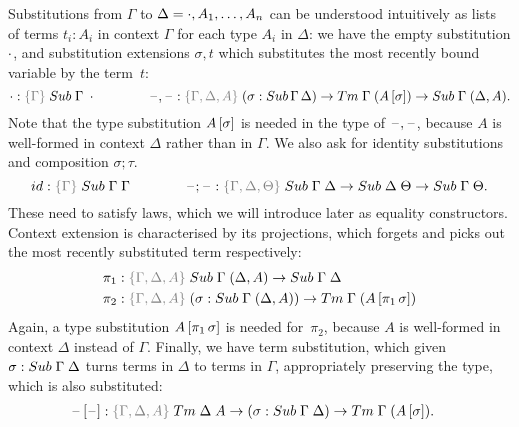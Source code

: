 \documentclass[a4paper,UKenglish,numberwithinsect,cleveref,thm-restate]{lipics-v2021}
\begin{document}
Substitutions from $\Gamma$ to $\Delta = \cdot, A_1, \ldots, A_n$ can be understood intuitively as lists of terms $t_i : A_i$ in context $\Gamma$ for each type $A_i$ in $\Delta$: we have the empty substitution $\cdot$, and substitution extensions $\sigma, t$ which substitutes the most recently bound variable by the term~$t$:
\[
  \emptysub : \implicit{\Gamma}\;\Sub\;\Gamma\;\emptyctx
  \qquad\qquad
  \blank,\blank : \implicit{\Gamma, \Delta, A}\; (\sigma : \Sub\,\Gamma\,\Delta) \to \Tm\;\Gamma\;(\sub{A}{\sigma}) \to \Sub\;\Gamma\;(\Delta, A).
\]
Note that the type substitution ${A}\,[\sigma]$ is needed in the type of $\mathord{\hspace{1pt}\text{--}\hspace{1pt}},\mathord{\hspace{1pt}\text{--}\hspace{1pt}}$, because $A$ is well-formed in context $\Delta$ rather than in $\Gamma$.
We also ask for identity substitutions and composition $\sigma;\tau$.
\[
  \idS : \implicit{\Gamma}\; \Sub\;\Gamma\;\Gamma
  \qquad\qquad \blank;\blank : \implicit{\Gamma, \Delta, \Theta}\;\Sub\;\Gamma\;\Delta \to \Sub\;\Delta\;\Theta \to \Sub\;\Gamma\;\Theta.
\]
These need to satisfy laws, which we will introduce later as equality constructors.
Context extension is characterised by its projections, which forgets and picks out the most recently substituted term respectively:
\begin{alignat*}{3}
  \pi_1 & : \implicit{\Gamma, \Delta, A}\;\Sub\;\Gamma\;(\Delta, A) \to \Sub\;\Gamma\;\Delta \\
  \pi_2 & : \implicit{\Gamma, \Delta, A}\;(\sigma : \Sub\;\Gamma\;(\Delta, A)) \to \Tm\;\Gamma\;(\sub{A}{\pi_1\,\sigma})
\end{alignat*}
%
Again, a type substitution ${A}\,[\pi_1\,\sigma]$ is needed for~$\pi_2$, because $A$ is well-formed in context $\Delta$ instead of $\Gamma$.
Finally, we have term substitution, which given $\sigma : \Sub\;\Gamma\;\Delta$ turns terms in $\Delta$ to terms in $\Gamma$, appropriately preserving the type, which is also substituted:
\begin{alignat*}{3}
  \sub{\blank}{\blank} & : \implicit{\Gamma,\Delta, A}\;\Tm\;\Delta\;A \to (\sigma : \Sub\;\Gamma\;\Delta) \to \Tm\;\Gamma\;(\sub{A}{\sigma}).
\end{alignat*}
\end{document}
